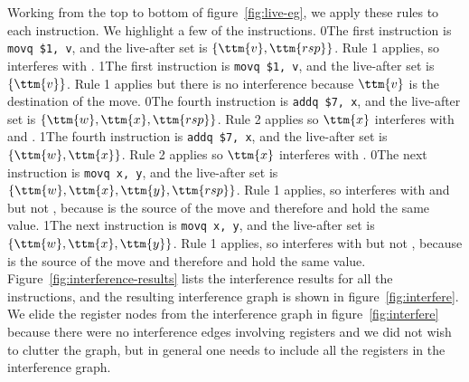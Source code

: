 \documentclass[7x10]{TimesAPriori_MIT}%
\def\racketEd{0}
\def\pythonEd{1}
\def\edition{1}
\newcommand{\racket}[1]{{\if\edition\racketEd{#1}\fi}}
\newcommand{\pythonColor}[0]{}
\newcommand{\python}[1]{{\if\edition\pythonEd\pythonColor #1\fi}}
\numberwithin{theorem}{chapter}
\numberwithin{definition}{chapter}
\numberwithin{equation}{chapter}
\begin{document}
Working from the top to bottom of figure~\ref{fig:live-eg}, we apply
these rules to each instruction. We highlight a few of the
instructions.  \racket{The first instruction is \lstinline{movq $1, v},
  and the live-after set is $\{\ttm{v},\ttm{rsp}\}$. Rule 1 applies,
  so \code{v} interferes with \code{rsp}.}
%
\python{The first instruction is \lstinline{movq $1, v}, and the
  live-after set is $\{\ttm{v}\}$. Rule 1 applies but there is
  no interference because $\ttm{v}$ is the destination of the move.}
%
\racket{The fourth instruction is \lstinline{addq $7, x}, and the
  live-after set is $\{\ttm{w},\ttm{x},\ttm{rsp}\}$. Rule 2 applies so
  $\ttm{x}$ interferes with  and \ttm{rsp}.}
%
\python{The fourth instruction is \lstinline{addq $7, x}, and the
  live-after set is $\{\ttm{w},\ttm{x}\}$. Rule 2 applies so
  $$ interferes with .}
%
\racket{The next instruction is \lstinline{movq x, y}, and the
  live-after set is $\{\ttm{w},\ttm{x},\ttm{y},\ttm{rsp}\}$. Rule 1
  applies, so \ttm{y} interferes with \ttm{w} and \ttm{rsp} but not
  \ttm{x}, because \ttm{x} is the source of the move and therefore
   and  hold the same value.}
%
\python{The next instruction is \lstinline{movq x, y}, and the
  live-after set is $\{\ttm{w},\ttm{x},\ttm{y}\}$. Rule 1
  applies, so \ttm{y} interferes with \ttm{w} but not
  \ttm{x}, because \ttm{x} is the source of the move and therefore
  \ttm{x} and \ttm{y} hold the same value.}
%
Figure~\ref{fig:interference-results} lists the interference results
for all the instructions, and the resulting interference graph is
shown in figure~\ref{fig:interfere}. We elide the register nodes from
the interference graph in figure~\ref{fig:interfere} because there
were no interference edges involving registers and we did not wish to
clutter the graph, but in general one needs to include all the
registers in the interference graph.
\end{document}
